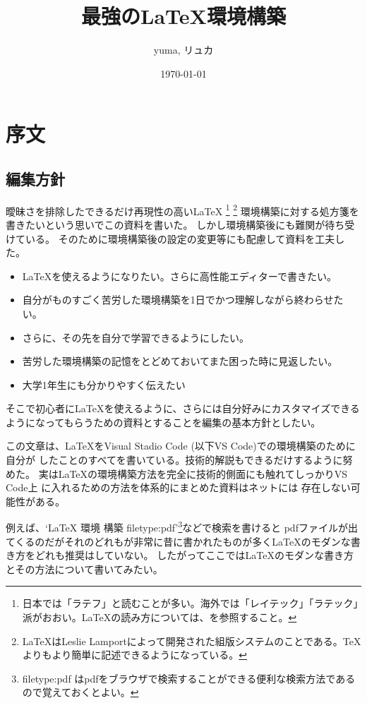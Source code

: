 \documentclass[titlepage]{ltjsarticle}
\begin{document}
\title{最強の\LaTeX 環境構築}
\author{yuma, リュカ}
\date{\today}
\maketitle
\section{序文}
\subsection{編集方針}

曖昧さを排除したできるだけ再現性の高い\LaTeX \index{\LaTeX}
\footnote{日本では「ラテフ」と読むことが多い。海外では「レイテック」「ラテック」派がおおい。\LaTeX の読み方については、\cite{文書システムLaTeX}を参照すること。
}
\footnote{\LaTeX はLeslie Lamportによって開発された組版システムのことである。\TeX よりもより簡単に記述できるようになっている。
}
環境構築に対する処方箋を書きたいという思いでこの資料を書いた。
しかし環境構築後にも難関が待ち受けている。
そのために環境構築後の設定の変更等にも配慮して資料を工夫した。
\begin{itemize}
  \item \LaTeX を使えるようになりたい。さらに高性能エディターで書きたい。
  \item 自分がものすごく苦労した環境構築を1日でかつ理解しながら終わらせたい。
  \item さらに、その先を自分で学習できるようにしたい。
  \item 苦労した環境構築の記憶をとどめておいてまた困った時に見返したい。
  \item 大学1年生にも分かりやすく伝えたい
\end{itemize}
そこで初心者に\LaTeX を使えるように、さらには自分好みにカスタマイズできるようになってもらうための資料とすることを編集の基本方針としたい。

この文章は、\LaTeX をVisual Stadio Code (以下VS Code)での環境構築のために自分が
したことのすべてを書いている。技術的解説もできるだけするように努めた。
実は\LaTeX の環境構築方法を完全に技術的側面にも触れてしっかりVS Code上
に入れるための方法を体系的にまとめた資料はネットには
存在しない可能性がある。

例えば、`LaTeX 環境 構築 filetype:pdf'\footnote{filetype:pdf はpdfをブラウザで検索することができる便利な検索方法であるので覚えておくとよい。}などで検索を書けると
pdfファイルが出てくるのだがそれのどれもが非常に昔に書かれたものが多く\LaTeX のモダンな書き方をどれも推奨はしていない。
したがってここでは\LaTeX のモダンな書き方とその方法について書いてみたい。
\end{document}
